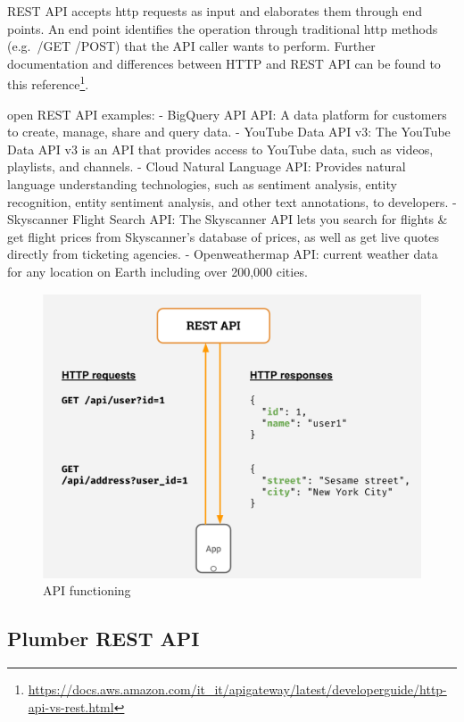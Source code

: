 \documentclass[
  12pt,
  a4paper,
  oneside]{book}
\DeclareRobustCommand{\href}[2]{#2\footnote{\url{#1}}}
\begin{document}
REST API accepts http requests as input and elaborates them through end points. An end point identifies the operation through traditional http methods (e.g.~/GET /POST) that the API caller wants to perform. Further documentation and differences between HTTP and REST API can be found to this \href{https://docs.aws.amazon.com/it_it/apigateway/latest/developerguide/http-api-vs-rest.html}{reference}.

open REST API examples:
- BigQuery API API: A data platform for customers to create, manage, share and query data.
- YouTube Data API v3: The YouTube Data API v3 is an API that provides access to YouTube data, such as videos, playlists, and channels.
- Cloud Natural Language API: Provides natural language understanding technologies, such as sentiment analysis, entity recognition, entity sentiment analysis, and other text annotations, to developers.
- Skyscanner Flight Search API: The Skyscanner API lets you search for flights \& get flight prices from Skyscanner's database of prices, as well as get live quotes directly from ticketing agencies.
- Openweathermap API: current weather data for any location on Earth including over 200,000 cities.

\begin{figure}
\centering
\includegraphics{images/Rest-API.png}
\caption{API functioning}
\end{figure}

\hypertarget{plumberapi}{%
\subsection{Plumber REST API}\label{plumberapi}}
\end{document}
